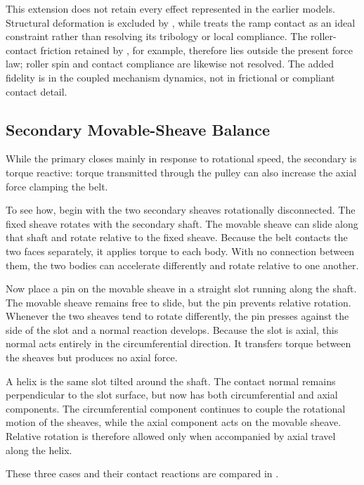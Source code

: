 \documentclass[11pt]{report}
\numberwithin{equation}{section}
\newcounter{assump}
\begin{document}
This extension does not retain every effect represented in the earlier
models. Structural deformation is excluded by ,
while  treats the ramp contact as an
ideal constraint rather than resolving its tribology or local compliance. The
roller-contact friction retained by \citet{KimEtAl2002}, for example,
therefore lies outside the present force law; roller spin and contact compliance
are likewise not resolved. The added fidelity is in the coupled
mechanism dynamics, not in frictional or compliant contact detail.


\subsection{Secondary Movable-Sheave Balance}
\label{sec:secondary_movable_sheave_balance}

While the primary closes mainly in response to rotational speed, the secondary is
torque reactive: torque transmitted through the pulley can also increase the
axial force clamping the belt.

To see how, begin with the two secondary sheaves rotationally disconnected.
The fixed sheave rotates with the secondary shaft. The movable sheave can slide
along that shaft and rotate relative to the fixed sheave. Because the belt
contacts the two faces separately, it applies torque to each body. With no
connection between them, the two bodies can accelerate differently and rotate
relative to one another.

Now place a pin on the movable sheave in a straight slot running along the
shaft. The movable sheave remains free to slide, but the pin prevents relative
rotation. Whenever the two sheaves tend to rotate differently, the pin presses
against the side of the slot and a normal reaction develops. Because the slot
is axial, this normal acts entirely in the circumferential direction. It
transfers torque between the sheaves but produces no axial force.

A helix is the same slot tilted around the shaft. The contact normal remains
perpendicular to the slot surface, but now has both circumferential and axial
components. The circumferential component continues to couple the rotational
motion of the sheaves, while the axial component acts on the movable sheave.
Relative rotation is therefore allowed only when accompanied by axial travel
along the helix.

These three cases and their contact reactions are compared in
.
\end{document}
